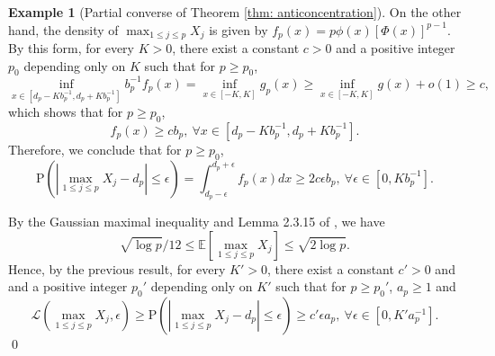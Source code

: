 \documentclass[11pt,reqno]{amsart}
\theoremstyle{definition}
\newtheorem{example}{Example}
\newcommand{\LL}{ \mathcal{L}}
\renewcommand{\Pr}{{\mathrm{P}}}
\begin{document}
\begin{example}[Partial converse of Theorem \ref{thm: anticoncentration}]
On the other hand, the density of $\max_{1 \leq j \leq p} X_{j}$ is given by $f_{p}(x) = p \phi(x) [ \Phi(x) ]^{p-1}$.
By this form, for every $K > 0$, there exist a constant $c > 0$ and a positive integer $p_{0}$ depending only on $K$ such that for $p \geq p_{0}$,
\begin{equation*}
\inf_{x \in [ d_{p} - K b_{p}^{-1}, d_{p} +K b_{p}^{-1}]} b_{p}^{-1} f_{p}(x) = \inf_{x \in [-K,K]} g_{p}(x) \geq \inf_{x \in [-K,K]} g(x) + o(1) \geq c,
\end{equation*}
which shows that for $p \geq p_{0}$,
\begin{equation*}
f_{p}(x) \geq c b_{p}, \ \forall x \in [ d_{p} - Kb_{p}^{-1}, d_{p} +K b_{p}^{-1}].
\end{equation*}
Therefore, we conclude that for $p \geq p_{0}$,
\begin{equation*}
\Pr(|\max_{1 \leq j \leq p} X_{j} - d_{p} | \leq \epsilon) = \int_{d_{p}-\epsilon}^{d_{p}+\epsilon} f_{p}(x) dx \geq 2 c \epsilon b_{p}, \ \forall \epsilon \in [ 0, K b_{p}^{-1} ].
\end{equation*}

By the Gaussian maximal inequality and Lemma 2.3.15 of \cite{D99}, we have
\begin{equation*}
\sqrt{\log p}/12  \leq \mathbb{E}[ \max_{1 \leq j \leq p} X_{j}] \leq \sqrt{2 \log p}.
\end{equation*}
Hence,  by the previous result, for every  $K' > 0$, there exist a constant $c' > 0$ and and a positive integer $p_{0}'$ depending only on $K'$ such that for $p \geq p_{0}'$,
$a_{p} \geq 1$ and
\begin{equation*}
\LL (\max_{1 \leq j \leq p} X_{j},\epsilon) \geq \Pr(|\max_{1 \leq j \leq p} X_{j} - d_{p} | \leq \epsilon) \geq c' \epsilon a_{p}, \ \forall \epsilon \in [0, K'a^{-1}_{p} ].
\end{equation*}
\qed
\end{example}
\end{document}
